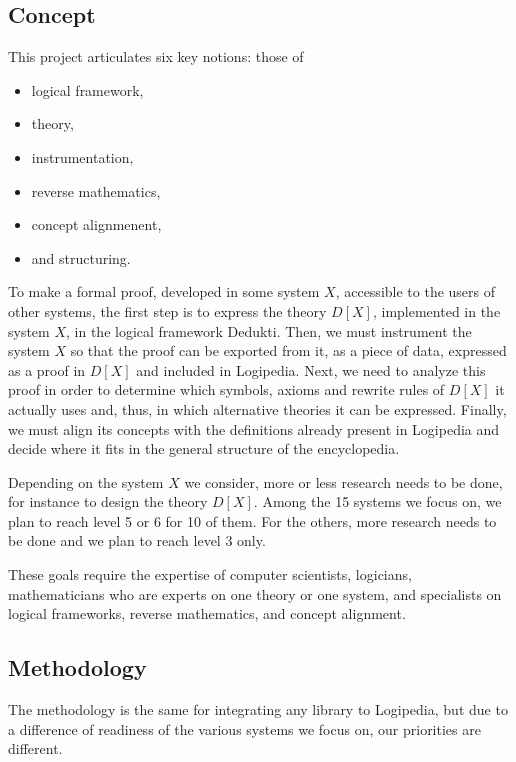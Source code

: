 \subsection{Concept}

This project articulates six key notions: those of 
\begin{itemize}
\item logical framework,
\item theory,
\item instrumentation,
\item reverse mathematics,
\item concept alignmenent,
\item and structuring.
\end{itemize}

To make a formal proof, developed in some system $X$, accessible to
the users of other systems, the first step is to express the theory
$D[X]$, implemented in the system $X$, in the logical framework {\sc
  Dedukti}.  Then, we must instrument the system $X$ so that the proof
can be exported from it, as a piece of data, expressed as a proof in
$D[X]$ and included in {\sc Logipedia}. Next, we need to analyze this
proof in order to determine which symbols, axioms and rewrite rules of
$D[X]$ it actually uses and, thus, in which alternative theories it
can be expressed.  Finally, we must align its concepts with the
definitions already present in {\sc Logipedia} and decide where it
fits in the general structure of the encyclopedia.

Depending on the system $X$ we consider, more or less research needs
to be done, for instance to design the theory $D[X]$. Among the 15
systems we focus on, we plan to reach level 5 or 6 for 10 of them.
For the others, more research needs to be done and we plan to reach
level 3 only.

These goals require the expertise of computer scientists, logicians,
mathematicians who are experts on one theory or one system, and
specialists on logical frameworks, reverse mathematics, and concept
alignment.

\subsection{Methodology}

The methodology is the same for integrating any library to {\sc Logipedia},
but due to a difference of readiness of the various systems we focus on,
our priorities are different.

